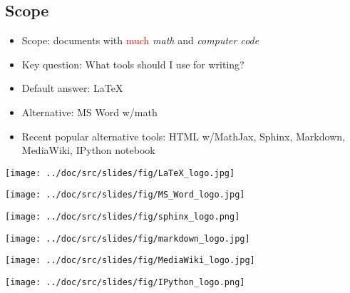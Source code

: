 \documentclass[%
oneside,                 %
final,                   %
10pt]{article}
\begin{document}
\subsection{Scope}
\begin{itemize}
  \item Scope: documents with \textcolor{red}{much} \emph{math} and \emph{computer code}
  \item Key question: What tools should I use for writing?
  \item Default answer: {\LaTeX}
  \item Alternative: MS Word w/math
  \item Recent popular alternative tools: HTML w/MathJax, Sphinx, Markdown, MediaWiki, IPython notebook
\end{itemize}
\noindent
\vspace{6mm}
\centerline{\texttt{[image: ../doc/src/slides/fig/LaTeX\_logo.jpg]}}
\vspace{6mm}
\vspace{6mm}
\centerline{\texttt{[image: ../doc/src/slides/fig/MS\_Word\_logo.jpg]}}
\vspace{6mm}
\vspace{6mm}
\centerline{\texttt{[image: ../doc/src/slides/fig/sphinx\_logo.png]}}
\vspace{6mm}
\vspace{6mm}
\centerline{\texttt{[image: ../doc/src/slides/fig/markdown\_logo.jpg]}}
\vspace{6mm}
\vspace{6mm}
\centerline{\texttt{[image: ../doc/src/slides/fig/MediaWiki\_logo.jpg]}}
\vspace{6mm}
\vspace{6mm}
\centerline{\texttt{[image: ../doc/src/slides/fig/IPython\_logo.png]}}
\vspace{6mm}
\end{document}
